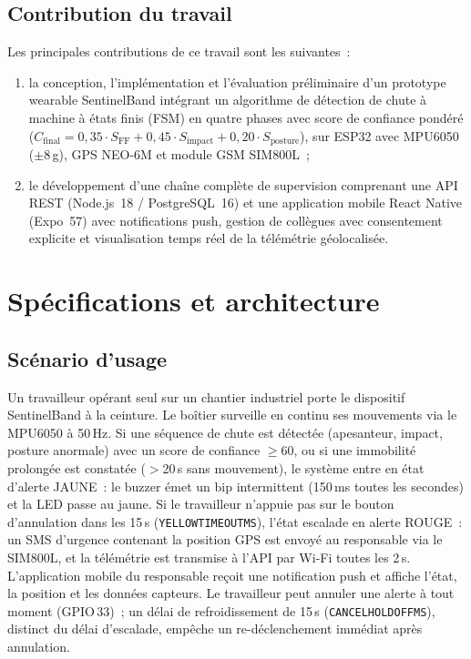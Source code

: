 \documentclass[12pt,a4paper]{article}
\renewcommand{\_}{\textunderscore\allowbreak}
\begin{document}
\subsection{Contribution du travail}

Les principales contributions de ce travail sont les suivantes~:
\begin{enumerate}
    \item la conception, l'implémentation et l'évaluation préliminaire d'un prototype wearable SentinelBand intégrant un algorithme de détection de chute à machine à états finis (FSM) en quatre phases avec score de confiance pondéré ($C_{\text{final}} = 0{,}35 \cdot S_{\text{FF}} + 0{,}45 \cdot S_{\text{impact}} + 0{,}20 \cdot S_{\text{posture}}$), sur ESP32 avec MPU6050 ($\pm$8\,g), GPS NEO-6M et module GSM SIM800L~;
    \item le développement d'une chaîne complète de supervision comprenant une API REST (Node.js~18 / PostgreSQL~16) et une application mobile React Native (Expo~57) avec notifications push, gestion de collègues avec consentement explicite et visualisation temps réel de la télémétrie géolocalisée.
\end{enumerate}

\section{Spécifications et architecture}

\subsection{Scénario d'usage}

Un travailleur opérant seul sur un chantier industriel porte le dispositif SentinelBand à la ceinture. Le boîtier surveille en continu ses mouvements via le MPU6050 à 50\,Hz. Si une séquence de chute est détectée (apesanteur, impact, posture anormale) avec un score de confiance $\geq 60$, ou si une immobilité prolongée est constatée ($>$20\,s sans mouvement), le système entre en état d'alerte JAUNE~: le buzzer émet un bip intermittent (150\,ms toutes les secondes) et la LED passe au jaune. Si le travailleur n'appuie pas sur le bouton d'annulation dans les 15\,s (\texttt{YELLOW\_TIMEOUT\_MS}), l'état escalade en alerte ROUGE~: un SMS d'urgence contenant la position GPS est envoyé au responsable via le SIM800L, et la télémétrie est transmise à l'API par Wi-Fi toutes les 2\,s. L'application mobile du responsable reçoit une notification push et affiche l'état, la position et les données capteurs. Le travailleur peut annuler une alerte à tout moment (GPIO\,33)~; un délai de refroidissement de 15\,s (\texttt{CANCEL\_HOLDOFF\_MS}), distinct du délai d'escalade, empêche un re-déclenchement immédiat après annulation.
\end{document}
